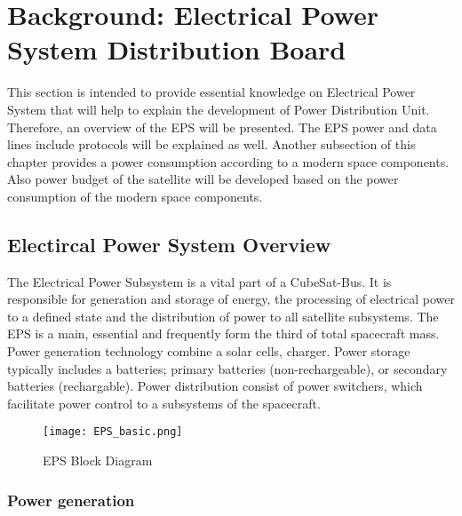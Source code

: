 \chapter{Background: Electrical Power System Distribution Board \label{cha:chapter2}}
This section is intended to provide essential knowledge on Electrical Power System that will help to explain the development of Power Distribution Unit.
Therefore, an overview of the EPS will be presented. The EPS power and data lines include protocols will be explained as well. Another subsection of this chapter provides a power consumption according to a modern space components. Also power budget of the satellite will be developed based on the power consumption of the modern space components.

\section{Electircal Power System Overview \label{sec:tech}}
The Electrical Power Subsystem is a vital part of a CubeSat-Bus. It is responsible for generation and storage of energy, the processing of electrical power to a defined state and the distribution of power to all satellite subsystems. The EPS is a main, essential and frequently form the third of total spacecraft mass. Power generation technology combine a solar cells, charger. Power storage typically includes a batteries; primary batteries (non-rechargeable), or secondary batteries (rechargable). Power distribution consist of power switchers, which facilitate power control to a subsystems of the spacecraft.



	\begin{figure}[h]
		\centering
		\texttt{[image: EPS\_basic.png]}
			\caption{EPS Block Diagram}
			\label{fig: EPS}
	\end{figure}

\subsection{Power generation \label{sec:tech}}



